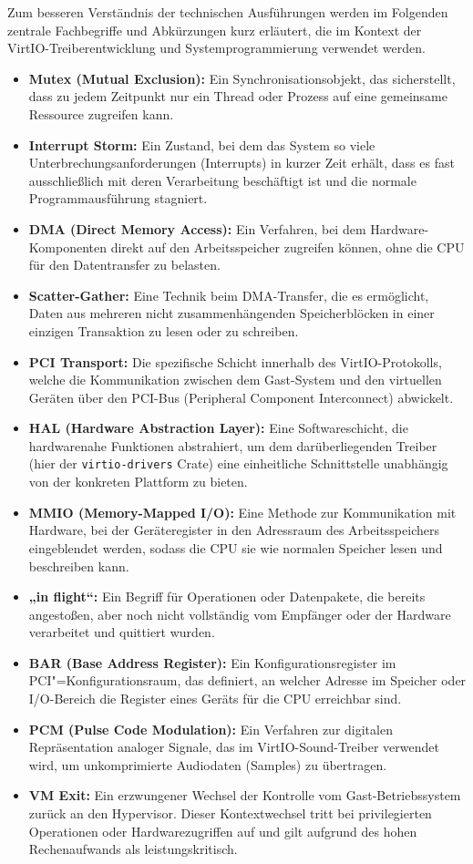 Zum besseren Verständnis der technischen Ausführungen werden im Folgenden zentrale Fachbegriffe und Abkürzungen kurz erläutert, die im Kontext der VirtIO-Treiberentwicklung und Systemprogrammierung verwendet werden.

\begin{itemize}
	\item \textbf{Mutex (Mutual Exclusion):} Ein Synchronisationsobjekt, das sicherstellt, dass zu jedem Zeitpunkt nur ein Thread oder Prozess auf eine gemeinsame Ressource zugreifen kann.
	\item \textbf{Interrupt Storm:} Ein Zustand, bei dem das System so viele Unterbrechungsanforderungen (Interrupts) in kurzer Zeit erhält, dass es fast ausschließlich mit deren Verarbeitung beschäftigt ist und die normale Programmausführung stagniert.
	\item \textbf{DMA (Direct Memory Access):} Ein Verfahren, bei dem Hardware-Komponenten direkt auf den Arbeitsspeicher zugreifen können, ohne die CPU für den Datentransfer zu belasten.
	\item \textbf{Scatter-Gather:} Eine Technik beim DMA-Transfer, die es ermöglicht, Daten aus mehreren nicht zusammenhängenden Speicherblöcken in einer einzigen Transaktion zu lesen oder zu schreiben.
	\item \textbf{PCI Transport:} Die spezifische Schicht innerhalb des VirtIO-Protokolls, welche die Kommunikation zwischen dem Gast-System und den virtuellen Geräten über den PCI-Bus (Peripheral Component Interconnect) abwickelt.
	\item \textbf{HAL (Hardware Abstraction Layer):} Eine Softwareschicht, die hardwarenahe Funktionen abstrahiert, um dem darüberliegenden Treiber (hier der \texttt{virtio-drivers} Crate) eine einheitliche Schnittstelle unabhängig von der konkreten Plattform zu bieten.
	\item \textbf{MMIO (Memory-Mapped I/O):} Eine Methode zur Kommunikation mit Hardware, bei der Geräteregister in den Adressraum des Arbeitsspeichers eingeblendet werden, sodass die CPU sie wie normalen Speicher lesen und beschreiben kann.
	\item \textbf{„in flight“:} Ein Begriff für Operationen oder Datenpakete, die bereits angestoßen, aber noch nicht vollständig vom Empfänger oder der Hardware verarbeitet und quittiert wurden.
	\item \textbf{BAR (Base Address Register):} Ein Konfigurationsregister im PCI"=Konfigurationsraum, das definiert, an welcher Adresse im Speicher oder I/O-Bereich die Register eines Geräts für die CPU erreichbar sind.
	\item \textbf{PCM (Pulse Code Modulation):} Ein Verfahren zur digitalen Repräsentation analoger Signale, das im VirtIO-Sound-Treiber verwendet wird, um unkomprimierte Audiodaten (Samples) zu übertragen.
	\item \textbf{VM Exit:} Ein erzwungener Wechsel der Kontrolle vom Gast-Betriebssystem zurück an den Hypervisor. Dieser Kontextwechsel tritt bei privilegierten Operationen oder Hardwarezugriffen auf und gilt aufgrund des hohen Rechenaufwands als leistungskritisch.
\end{itemize}
	